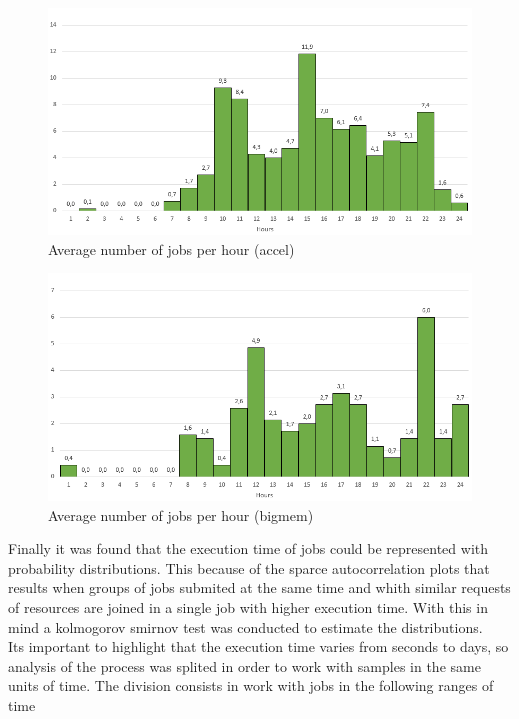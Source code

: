 \documentclass{wscpaperproc}
\begin{document}
\begin{figure}[h!]
\includegraphics[width=\textwidth]{./images/average_arrivals_accel}
\caption{Average number of jobs per hour (accel)}
\label{arrival_accel}
\end{figure}

\begin{figure}[h!]
\includegraphics[width=\textwidth]{./images/average_arrivals_bigmem}
\caption{Average number of jobs per hour (bigmem)}
\label{arrival_bigmem}
\end{figure}

Finally it was found that the execution time of jobs could be represented with
probability distributions. This because of the sparce autocorrelation plots that
results when groups of jobs submited at the same time and
whith similar requests of resources are joined in a single job with higher
execution time. With this in mind a kolmogorov smirnov test was conducted to
estimate the distributions. \\

Its important to highlight that the execution time varies from seconds to days,
so analysis of the process was splited in order to work with samples in the same
units of time. The division consists in work with jobs in the following ranges
of time
\end{document}
